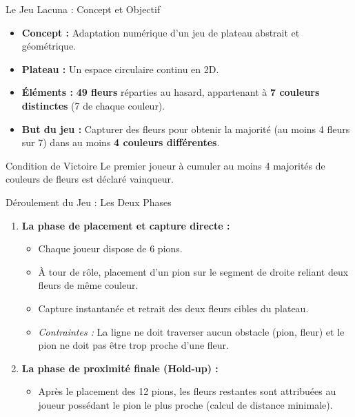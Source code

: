 \documentclass{beamer}
\begin{document}
\begin{frame}{Le Jeu Lacuna : Concept et Objectif}
    \begin{itemize}
        \item \textbf{Concept :} Adaptation numérique d'un jeu de plateau abstrait et géométrique.
        \item \textbf{Plateau :} Un espace circulaire continu en 2D.
        \item \textbf{Éléments :} \textbf{49 fleurs} réparties au hasard, appartenant à \textbf{7 couleurs distinctes} (7 de chaque couleur).
        \item \textbf{But du jeu :} Capturer des fleurs pour obtenir la majorité (au moins 4 fleurs sur 7) dans au moins \textbf{4 couleurs différentes}.
    \end{itemize}
    \begin{block}{Condition de Victoire}
        Le premier joueur à cumuler au moins 4 majorités de couleurs de fleurs est déclaré vainqueur.
    \end{block}
\end{frame}

\begin{frame}{Déroulement du Jeu : Les Deux Phases}
    \begin{enumerate}
        \item \textbf{La phase de placement et capture directe :}
        \begin{itemize}
            \item Chaque joueur dispose de 6 pions.
            \item À tour de rôle, placement d'un pion sur le segment de droite reliant deux fleurs de même couleur.
            \item Capture instantanée et retrait des deux fleurs cibles du plateau.
            \item \textit{Contraintes :} La ligne ne doit traverser aucun obstacle (pion, fleur) et le pion ne doit pas être trop proche d'une fleur.
        \end{itemize}
        \item \textbf{La phase de proximité finale (Hold-up) :}
        \begin{itemize}
            \item Après le placement des 12 pions, les fleurs restantes sont attribuées au joueur possédant le pion le plus proche (calcul de distance minimale).
        \end{itemize}
    \end{enumerate}
\end{frame}
\end{document}
